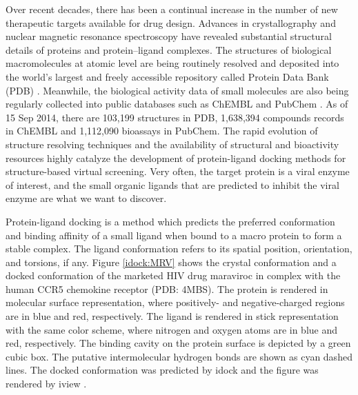Over recent decades, there has been a continual increase in the number of new therapeutic targets available for drug design. Advances in crystallography and nuclear magnetic resonance spectroscopy have revealed substantial structural details of proteins and protein–ligand complexes. The structures of biological macromolecules at atomic level are being routinely resolved and deposited into the world's largest and freely accessible repository called Protein Data Bank (PDB) \citep{539,537}. Meanwhile, the biological activity data of small molecules are also being regularly collected into public databases such as ChEMBL \citep{1424} and PubChem \citep{1422}. As of 15 Sep 2014, there are 103,199 structures in PDB, 1,638,394 compounds records in ChEMBL and 1,112,090 bioassays in PubChem. The rapid evolution of structure resolving techniques and the availability of structural and bioactivity resources highly catalyze the development of protein-ligand docking methods for structure-based virtual screening. Very often, the target protein is a viral enzyme of interest, and the small organic ligands that are predicted to inhibit the viral enzyme are what we want to discover.

Protein-ligand docking is a method which predicts the preferred conformation and binding affinity of a small ligand when bound to a macro protein to form a stable complex. The ligand conformation refers to its spatial position, orientation, and torsions, if any. Figure \ref{idock:MRV} shows the crystal conformation and a docked conformation of the marketed HIV drug maraviroc in complex with the human CCR5 chemokine receptor (PDB: 4MBS). The protein is rendered in molecular surface representation, where positively- and negative-charged regions are in blue and red, respectively. The ligand is rendered in stick representation with the same color scheme, where nitrogen and oxygen atoms are in blue and red, respectively. The binding cavity on the protein surface is depicted by a green cubic box. The putative intermolecular hydrogen bonds are shown as cyan dashed lines. The docked conformation was predicted by idock \citep{1153} and the figure was rendered by iview \citep{1366}.

